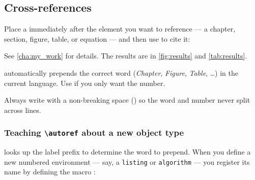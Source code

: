 \subsection{Cross-references}
\label{sub:cross_references}

Place a \latexinline{\label} immediately after the element you want to reference — a chapter, section, figure, table, or equation — and then use \latexinline{\autoref} to cite it:

\begin{latexcode}
See \autoref{cha:my_work} for details.
The results are in \autoref{fig:results} and \autoref{tab:results}.
\end{latexcode}

\latexinline{\autoref} automatically prepends the correct word (\emph{Chapter}, \emph{Figure}, \emph{Table}, \ldots) in the current language.
Use \latexinline{\ref} if you only want the number.

\begin{highlightbox}[title={Tip: non-breaking space before \textbackslash ref}]
  Always write  with a non-breaking space (\latexinline{~}) so the word and number never split across lines.
\end{highlightbox}

\subsubsection{Teaching \texttt{\textbackslash autoref} about a new object type}
\label{ssub:autoref_new_type}

\latexinline{\autoref} looks up the label prefix to determine the word to prepend.
When you define a new numbered environment — say, a \texttt{listing} or \texttt{algorithm} — you register its name by defining the macro :

\begin{latexcode}
\newcommand{\algorithmautorefname}{Algorithm}

\newcommand{\theoremautorefname}{Theorem}
\end{latexcode}

